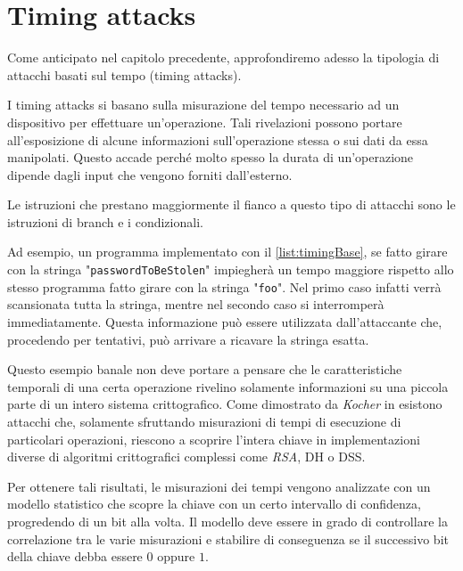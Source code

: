 \chapter{Timing attacks}
Come anticipato nel capitolo precedente, approfondiremo adesso la tipologia di attacchi basati sul tempo (timing attacks). 

I timing attacks si basano sulla misurazione del tempo necessario ad un dispositivo per effettuare un'operazione. Tali rivelazioni possono portare all'esposizione di alcune informazioni sull'operazione stessa o sui dati da essa manipolati. Questo accade perché molto spesso la durata di un'operazione dipende dagli input che vengono forniti dall'esterno.

Le istruzioni che prestano maggiormente il fianco a questo tipo di attacchi sono le istruzioni di branch e i condizionali.

\begin{center}
	
\end{center}

Ad esempio, un programma implementato con il \cref{list:timingBase}, se fatto girare con la stringa "\texttt{passwordToBeStolen}" impiegherà un tempo maggiore rispetto allo stesso programma fatto girare con la stringa "\texttt{foo}". Nel primo caso infatti verrà scansionata tutta la stringa, mentre nel secondo caso si interromperà immediatamente. Questa informazione può essere utilizzata dall'attaccante che, procedendo per tentativi, può arrivare a ricavare la stringa esatta.

Questo esempio banale non deve portare a pensare che le caratteristiche temporali di una certa operazione rivelino solamente informazioni su una piccola parte di un intero sistema crittografico. Come dimostrato da \emph{Kocher} in \cite{kocher1996timing} esistono attacchi che, solamente sfruttando misurazioni di tempi di esecuzione di particolari operazioni, riescono a scoprire l'intera chiave in implementazioni diverse di algoritmi crittografici complessi come \emph{RSA}, \ac{DH} o \ac{DSS}.

Per ottenere tali risultati, le misurazioni dei tempi vengono analizzate con un modello statistico che scopre la chiave con un certo intervallo di confidenza, progredendo di un bit alla volta. Il modello deve essere in grado di controllare la correlazione tra le varie misurazioni e stabilire di conseguenza se il successivo bit della chiave debba essere $0$ oppure $1$.

